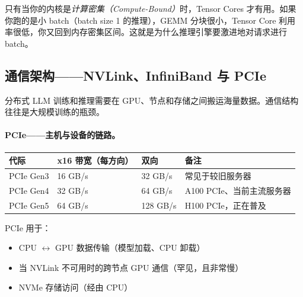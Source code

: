 \begin{warningbox}[Tensor Core 陷阱]
只有当你的内核是\emph{计算密集（Compute-Bound）}时，Tensor Cores 才有用。如果你跑的是小 batch（batch size 1 的推理），GEMM 分块很小，Tensor Core 利用率很低，你又回到内存密集区间。这就是为什么推理引擎要激进地对请求进行 batch。
\end{warningbox}

\subsection{通信架构——NVLink、InfiniBand 与 PCIe}
\label{communication-architecture-nvlink-infiniband-and-pcie}

分布式 LLM 训练和推理需要在 GPU、节点和存储之间搬运海量数据。通信结构往往是大规模训练的瓶颈。

\paragraph{PCIe——主机与设备的链路。}
\label{pcie-the-host-device-link.}

\begin{keybox}[PCIe 各代]
\begin{center}
\begin{tabular}{@{}l l l l@{}}
\toprule
\textbf{代际} & \textbf{x16 带宽（每方向）} & \textbf{双向} & \textbf{备注} \\
\midrule
PCIe Gen3 & 16 GB/s & 32 GB/s & 常见于较旧服务器 \\
PCIe Gen4 & 32 GB/s & 64 GB/s & A100 PCIe、当前主流服务器 \\
PCIe Gen5 & 64 GB/s & 128 GB/s & H100 PCIe，正在普及 \\
\bottomrule
\end{tabular}
\end{center}
\end{keybox}

PCIe 用于：

\begin{itemize}
  \item CPU $\leftrightarrow$ GPU 数据传输（模型加载、CPU 卸载）
  \item 当 NVLink 不可用时的跨节点 GPU 通信（罕见，且非常慢）
  \item NVMe 存储访问（经由 CPU）
\end{itemize}

